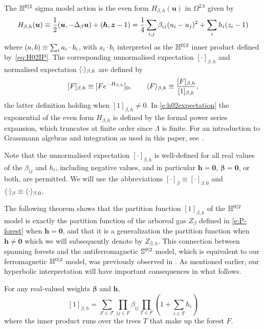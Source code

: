 \documentclass[11pt]{amsart}
\numberwithin{equation}{section}
\numberwithin{theorem}{section}
\newcommand{\cc}[1]{\mathcal{#1}}
\newcommand{\V}[1]{\boldsymbol{#1}}
\begin{document}
The $\mathbb{H}^{0|2}$ sigma model action is the even form $H_{\beta,h}(\V{u})$ in
$\Omega^{2\Lambda}$ given by
\begin{equation}
  \label{eq:H}
  H_{\beta,h}(\V{u})
  \bydef \frac{1}{2}(\V{u},-\Delta_{\beta}\V{u}) + (\V{h},\V{z}-1)
  = \frac{1}{4} \sum_{i,j}\beta_{ij}(u_i-u_j)^2 + \sum_i h_i (z_i-1)
\end{equation}
where $(a,b) \equiv \sum_{i}a_{i}\cdot b_{i}$, with $a_i\cdot b_i$
interpreted as the $\mathbb{H}^{0|2}$ inner product defined
by~\eqref{eq:H02IP}.
The corresponding unnormalised expectation $[\cdot]_{\beta,h}$
and normalised expectation $\langle \cdot \rangle_{\beta,h}$ are defined by
\begin{equation} \label{e:h02expectation}
  [F]_{\beta,h} \equiv [Fe^{-H_{\beta,h}}]_{0}, \qquad \langle F \rangle_{\beta,h}
  \equiv \frac{[F]_{\beta,h}}{[1]_{\beta,h}}, 
\end{equation}
the latter definition holding when $[1]_{\beta,h}\neq 0$.
In \eqref{e:h02expectation} 
the exponential of the even form $H_{\beta,h}$
is defined by the formal power series expansion, which truncates at
finite order since $\Lambda$ is finite.
For an introduction 
to Grassmann algebras and
integration as used in this paper, see~\cite[Appendix~A]{1904.01532}.

Note that the unnormalised expectation $[\cdot]_{\beta,h}$ is
well-defined for all real values of the $\beta_{ij}$ and $h_i$,
including negative values, and in particular $\V{h}=\V{0}$, $\V{\beta}=\V{0}$, or
both, are permitted. We will use the abbreviations $[\cdot]_\beta \equiv [\cdot]_{\beta,0}$ and $\langle \cdot \rangle_\beta\equiv \langle \cdot \rangle_{\beta,0}$.

The following theorem shows that the partition
function $[1]_{\beta,h}$ of the $\mathbb{H}^{0|2}$ model 
is exactly the partition function of the arboreal gas $Z_\beta$
defined in \eqref{e:P-forest} when $\V{h}=\V{0}$, and that it is a
generalization the partition function when $\V{h} \neq \V{0}$ which we
will subsequently denote by $Z_{\beta,h}$.  This connection between
spanning forests and the antiferromagnetic ${\mathbb S}^{0|2}$ model, which
is equivalent to our ferromagnetic $\mathbb{H}^{0|2}$ model, was previously
observed in \cite{MR2110547}. As mentioned earlier, our hyperbolic
interpretation will have important consequences in what follows.

\begin{theorem} \label{thm:H02forest}
  For any real-valued weights $\V{\beta}$ and $\V{h}$,
  \begin{equation}     \label{e:H02forest}
    [1]_{\beta,h}
    = \sum_{F\in\cc F} \prod_{ij\in F}\beta_{ij}\prod_{T\in F} (1+\sum_{i\in T}h_{i})
  \end{equation}
  where the inner product runs over the trees $T$ that make up the forest $F$.
\end{theorem}
\end{document}
